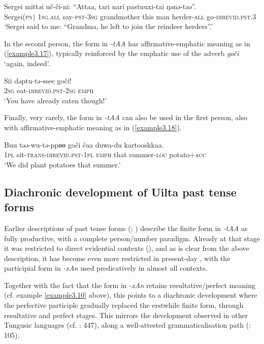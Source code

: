 \documentclass[output=paper,colorlinks,citecolor=brown]{langscibook}
\begin{document}
\ea
\label{example3.16}
\gll Sergei		mittəi	uč-či-ni: 		“Attaa,		tari	nari	pastuuxi-tai	ŋənə-təə”.\\
     	Sergei(\textsc{pn})	\textsc{1sg}.\textsc{all}	say-\textsc{pst}-\textsc{3sg}	grandmother	this	man	herder-\textsc{all}	go-\textsc{direvid}.\textsc{pst}.\textsc{3}\\
\glt `Sergei said to me: “Grandma, he left to join the reindeer herders”.’
\z

In the second person, the form in \textit{-tAA} has affirmative-emphatic meaning as in (\ref{example3.17}), typically reinforced by the emphatic use of the adverb \textit{goči} ‘again, indeed’.



\ea
\label{example3.17}
\gll Sii	dəptu-tə-ssee			goči!\\
     	\textsc{2sg}	eat-\textsc{direvid}.\textsc{pst}-\textsc{2sg}	\textsc{emph}\\
\glt `You have already eaten though!’
\z

Finally, very rarely, the form in \textit{-tAA} can also be used in the first person, also with affirmative-emphatic meaning as in (\ref{example3.18}).

\ea
\label{example3.18}
\gll Buu	təə-wu-tə-ppɵɵ			goči		čaa	duwa-du		kartooskkaa.\\
     	\textsc{1pl}	sit-\textsc{trans}-\textsc{direvid}.\textsc{pst}-\textsc{1pl}	\textsc{emph}	that	summer-\textsc{loc}	potato+\textsc{acc}\\
\glt `We did plant potatoes that summer.’
\z


\subsection{Diachronic development of Uilta past tense forms}\label{Section3.3.4}

Earlier descriptions of  past tense forms (\citealt{Ikegami_1959}; \citealt{Tsumagari_2009}) describe the finite form in \textit{-tAA} as fully productive, with a complete person/number paradigm. Already at that stage it was restricted to direct evidential contexts (\citealt{Ikegami_1959}), and as is clear from the above description, it has become even more restricted in present-day , with the participial form in \textit{-xAn} used predicatively in almost all contexts.

Together with the fact that the form in \textit{-xAn} retains resultative/perfect meaning (cf. example \ref{example3.10} above), this points to a diachronic development where the perfective participle gradually replaced the erstwhile finite form, through resultative and perfect stages. This mirrors the development observed in other Tungusic languages (cf. \citealt{Malchukov_2000}: 447), along a well-attested grammaticalisation path (\citealt{Bybee_1994}: 105).
\end{document}
